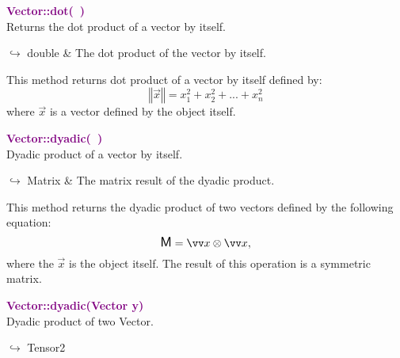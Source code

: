 \textcolor{purple}{\textbf{Vector::dot(~)}}\label{Vector::dot()}\\
Returns the dot product of a vector by itself.\vspace*{-0.5em}
\begin{tcolorbox}[grow to left by=-1cm, width=\textwidth-1cm,myArgs,tabularx={l|R}]
$\hookrightarrow$ double & The dot product of the vector by itself.
\end{tcolorbox}

This method returns dot product of a vector by itself defined by:
\begin{equation*}
 \left\Vert \overrightarrow{x} \right\Vert  = x_{1}^2 + x_{2}^2 + ... + x_{n}^2
\end{equation*}
where $\overrightarrow{x}$ is a vector defined by the object itself.

\textcolor{purple}{\textbf{Vector::dyadic(~)}}\label{Vector::dyadic()}\\
Dyadic product of a vector by itself.\vspace*{-0.5em}
\begin{tcolorbox}[grow to left by=-1cm, width=\textwidth-1cm,myArgs,tabularx={l|R}]
$\hookrightarrow$ Matrix & The matrix result of the dyadic product.
\end{tcolorbox}

This method returns the dyadic product of two vectors defined by the following equation:
\begin{equation*}
\M = \overrightarrow{x}\otimes\overrightarrow{x},
\end{equation*}
where the $\overrightarrow{x}$ is the object itself.
The result of this operation is a symmetric matrix.

\textcolor{purple}{\textbf{Vector::dyadic(Vector y)}}\label{Vector::dyadic(Vector y)}\\
Dyadic product of two Vector.\vspace*{-0.5em}
\begin{tcolorbox}[grow to left by=-1cm, width=\textwidth-1cm,myArgs,tabularx={l|R}]
$\hookrightarrow$ Tensor2
\end{tcolorbox}

